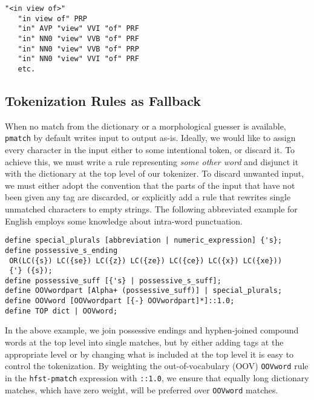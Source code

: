 \documentclass{llncs}
\begin{document}
\begin{center}
\begin{framed}
\begin{verbatim}
"<in view of>"
   "in view of" PRP
   "in" AVP "view" VVI "of" PRF
   "in" NN0 "view" VVB "of" PRF
   "in" NN0 "view" VVB "of" PRP
   "in" NN0 "view" VVI "of" PRF
   etc.
\end{verbatim}
\end{framed}
\end{center}

\subsection{Tokenization Rules as Fallback}

When no match from the dictionary or a morphological guesser is available,
\verb+pmatch+ by default
writes input to output as-is. Ideally, we would like to assign every character
in the input either to some intentional token, or discard it. 
To achieve this, we must write a rule representing
\emph{some other word} and disjunct it with the dictionary at the top level of
our tokenizer. To discard unwanted input, we must either adopt the convention
that the parts of the input that have not been
given any tag are discarded, or explicitly add a rule that rewrites single
unmatched characters to empty strings. The following abbreviated example for English
employs some knowledge about intra-word punctuation.

\begin{center}
\begin{framed}
\begin{verbatim}
define special_plurals [abbreviation | numeric_expression] {'s};
define possessive_s_ending
 OR(LC({s}) LC({se}) LC({z}) LC({ze}) LC({ce}) LC({x}) LC({xe}))
 {'} ({s});
define possessive_suff [{'s} | possessive_s_suff];
define OOVwordpart [Alpha+ (possessive_suff)] | special_plurals;
define OOVword [OOVwordpart [{-} OOVwordpart]*]::1.0;
define TOP dict | OOVword;
\end{verbatim}
\end{framed}
\end{center}

\noindent In the above example, we join possessive endings and hyphen-joined compound words at the top
level into single matches, but by either adding tags at the appropriate level
or by changing what is included at the top level it is easy to control the
tokenization. By weighting the out-of-vocabulary (OOV) \verb+OOVword+ rule in the \verb+hfst-pmatch+ expression with \verb+::1.0+, 
we ensure that equally long dictionary matches, which have zero weight, will be preferred over \verb+OOVword+ matches.
\end{document}
